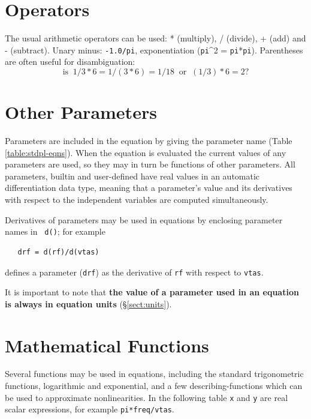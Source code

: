 \documentclass[11pt,openany,twoside]{book}
\numberwithin{equation}{section}		%
\newcommand{\Code}[1]{{\small\tt #1}}
\newcommand{\Sectref}[1]{\S\ref{#1}}
\newcommand{\Tableref}[1]{Table \ref{#1}}
\begin{document}
\section{Operators} \label{sect:operators}
The usual arithmetic operators can be used:
* (multiply), / (divide), + (add) and - (subtract).
Unary minus: \Code{-1.0/pi}, exponentiation (\Code{pi}\^{}2 = \Code{pi}*\Code{pi}).
Parentheses are often useful for disambiguation:
\begin{equation}
\text{is}\;\;1/3*6 = 1/(3*6)=1/18 \;\;  \text{or} \;\; (1/3)*6 = 2?
\end{equation}



\section{Other Parameters}\label{sect:otherpar}
Parameters are included in the equation by giving the parameter
name (\Tableref{table:stdpl-eqns}). When the equation is evaluated the current values of
any parameters are used, so they may in turn be functions
of other parameters. All parameters, builtin and user-defined have
real values in an automatic differentiation data type, meaning that
a parameter's value and its derivatives with respect to the independent
variables are computed simultaneously.
\par
Derivatives of parameters may be used in equations by enclosing
parameter names in \Code{ d()}; for example
\begin{lstlisting}
   drf = d(rf)/d(vtas)
\end{lstlisting}

defines a parameter (\Code{drf}) as the derivative of
\Code{rf} with respect to \Code{vtas}.
\par
It is important to note that {\bfseries the value of a parameter used in
an equation is always in equation units\/} (\Sectref{sect:units}).

\section{Mathematical Functions}\label{sect:bifcn}
Several functions may be used in equations, including the
standard trigonometric functions, logarithmic and exponential,
and a few describing-functions which can be used to approximate
nonlinearities.
In the following table \Code{x} and \Code{y}
are real scalar expressions, for example \Code{pi*freq/vtas}.
\end{document}
